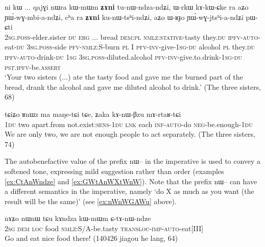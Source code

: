 \documentclass[oldfontcommands,oneside,a4paper,11pt]{article}
\newcommand{\ipa}[1]{{\phon \mbox{#1}}} %
\begin{document}
   \begin{exe}
\ex \label{ex:tunWndzandZi}
\gll  \ipa{nɤ-pi}   	\ipa{ni}   	\ipa{kɯ}   	...   	\ipa{qajɣi}   	\ipa{nɯra}   	\ipa{kɯ-mɯm}   	\textbf{\ipa{ʑɤni}}   	\ipa{tu-nɯ-ndza-ndʑi,}   	\ipa{ɯ-rkɯ}   	\ipa{kɤ-kɯ-ɕke}   	\ipa{ra}   	\ipa{aʑo}   	\ipa{ɲɯ́-wɣ-mbi-a-ndʑi,}   	\ipa{cʰa}   	\ipa{ra}   	\textbf{\ipa{ʑɤni}}   	\ipa{ku-nɯ-tsʰi-ndʑi,}   	\ipa{aʑo}   	\ipa{ɯ-ʁɟo}   	\ipa{ɲɯ́-wɣ-jtsʰi-a-ndʑi}   	\ipa{pɯ-ɕti}        \\
\textsc{2sg.poss}-elder.sister \textsc{du} \textsc{erg} ... bread \textsc{dem:pl} \textsc{nmlz:stative}-tasty they.\textsc{du} \textsc{ipfv}-\textsc{auto}-eat-\textsc{du} \textsc{3sg.poss}-side \textsc{pfv}-\textsc{nmlz:S}-burn \textsc{pl}  I \textsc{pfv}-\textsc{inv}-give-\textsc{1sg}-\textsc{du} alcohol \textsc{pl} they.\textsc{du} \textsc{ipfv}-\textsc{auto}-drink-\textsc{du} \textsc{1sg} \textsc{3sg.poss}-diluted.alcohol \textsc{pfv}-\textsc{inv}-give.to.drink-\textsc{1sg}-\textsc{du} \textsc{pst.ipfv}-be.\textsc{assert}  \\
 \glt    `Your two sisters (...) ate the tasty food and gave me the burned part of the bread, drank the alcohol and gave me diluted alcohol to drink.'  (The three sisters, 68)
\end{exe} 



   \begin{exe}
\ex \label{ex:kAnWBzu.mArtaRtCi}
\gll
\ipa{tɕiʑo} 	\ipa{ʁnɯz} 	\ipa{ma} 	\ipa{maŋe-tɕi} 	\ipa{tɕe,} 	\ipa{ʑaka} 	\ipa{kɤ-nɯ-βzu} 	\ipa{mɤ-rtaʁ-tɕi} \\
\textsc{1du} two apart.from not.exist:\textsc{sens}-\textsc{1du} \textsc{lnk} each \textsc{inf-auto}-do \textsc{neg}-be.enough-\textsc{1du} \\
\glt We are only two, we are not enough people to act separately. (The three sisters, 74)
\end{exe} 

The autobenefactive value of the prefix \ipa{nɯ--}  in the imperative is used to convey a softened tone, expressing mild suggestion rather than order (examples \ref{ex:CtAnWndze} and \ref{ex:GWtAnWXtWnW}). Note that the prefix \ipa{nɯ--}  can have a different semantics in the imperative, namely `do X as much as you want (the result will be the same)' (see  \ref{ex:nWnWGAWu} above).

\begin{exe}
\ex \label{ex:CtAnWndze}
\gll
\ipa{nɤʑo} 	\ipa{nɯnɯ} \ipa{tɕu} 	\ipa{kɤndza} 	\ipa{kɯ-mɯm} 	\ipa{ɕ-tɤ-nɯ-ndze} \\
\textsc{2sg} \textsc{dem} \textsc{loc} food \textsc{nmlz}:S/A-be.tasty \textsc{transloc-imp-auto}-eat[III] \\
\glt Go and eat nice food there! (140426 jiagou he lang, 64)
\end{exe}
\end{document}
